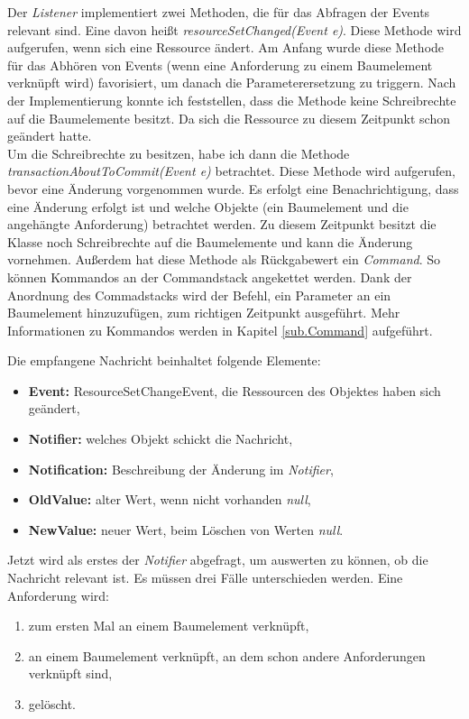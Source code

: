 Der \textit{Listener} implementiert zwei Methoden, die für das Abfragen der Events relevant sind. Eine davon heißt \textit{resourceSetChanged(Event e)}. Diese Methode wird aufgerufen, wenn sich eine Ressource ändert. Am Anfang wurde diese Methode  für das Abhören von Events (wenn eine Anforderung zu einem Baumelement verknüpft wird) favorisiert, um danach die Parameterersetzung zu triggern. Nach der Implementierung konnte ich feststellen, dass die Methode keine Schreibrechte auf die Baumelemente besitzt. Da sich die Ressource zu diesem Zeitpunkt schon geändert hatte.\\


Um die Schreibrechte zu besitzen, habe ich dann die Methode \textit{transactionAboutToCommit(Event e)} betrachtet. Diese Methode wird aufgerufen, bevor eine Änderung vorgenommen wurde. Es erfolgt eine Benachrichtigung, dass eine Änderung erfolgt ist und welche Objekte (ein Baumelement und die angehängte Anforderung) betrachtet werden. Zu diesem Zeitpunkt besitzt die Klasse noch Schreibrechte auf die Baumelemente und kann die Änderung vornehmen. Außerdem hat diese Methode als Rückgabewert ein \textit{Command}. So können Kommandos an der Commandstack angekettet werden. Dank der Anordnung des Commadstacks wird der Befehl, ein Parameter an ein Baumelement hinzuzufügen, zum richtigen Zeitpunkt ausgeführt. Mehr Informationen zu Kommandos werden in Kapitel \ref{sub.Command} aufgeführt.


Die empfangene Nachricht beinhaltet folgende Elemente: 

\begin{itemize}
\item \textbf{Event: }ResourceSetChangeEvent, die Ressourcen des Objektes haben sich geändert,
\item \textbf{Notifier: } welches Objekt schickt die Nachricht,
\item \textbf{Notification: }Beschreibung der Änderung im \textit{Notifier},
\item \textbf{OldValue: } alter Wert, wenn nicht vorhanden \textit{null},
\item \textbf{NewValue: } neuer Wert, beim Löschen von Werten \textit{null}.
\end{itemize}


Jetzt wird als erstes der \textit{Notifier} abgefragt, um auswerten zu können, ob die Nachricht relevant ist. Es müssen drei Fälle unterschieden werden. Eine Anforderung wird:


\begin{enumerate}
\item zum ersten Mal an einem Baumelement verknüpft,
\item an einem Baumelement verknüpft, an dem schon andere Anforderungen verknüpft sind,
\item gelöscht.
\end{enumerate}


